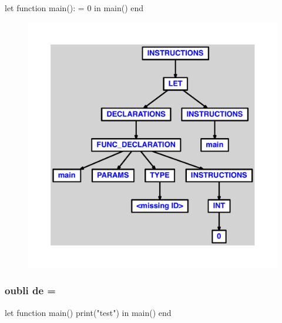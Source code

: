 \documentclass{article}
\begin{document}
\begin{verbatimtab}
let
	function main(): = 0
in main() end
\end{verbatimtab}
\begin{figure}[H]\centering\includegraphics[max width=\textwidth]{ast/ast_213.pdf}\end{figure}\subsubsection{oubli de =}
\begin{verbatimtab}
let
	function main() print("test")
in main() end
\end{verbatimtab}
\end{document}
